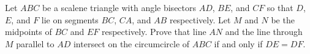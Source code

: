 Let $ABC$ be a scalene triangle with angle bisectors $AD$, $BE$, and $CF$ so that $D$, $E$, and $F$ lie on segments $BC$, $CA$, and $AB$ respectively. Let $M$ and $N$ be the midpoints of $BC$ and $EF$ respectively. Prove that line $AN$ and the line through $M$ parallel to $AD$ intersect on the circumcircle of $ABC$ if and only if $DE=DF$.

